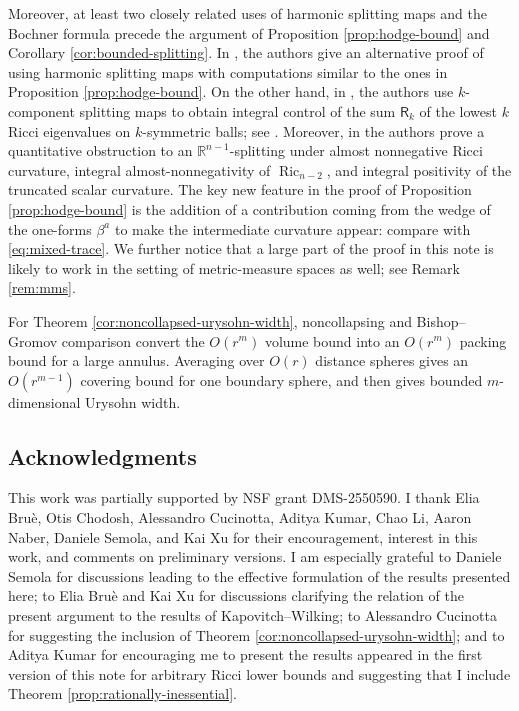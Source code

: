 \documentclass[11pt]{amsart}
\theoremstyle{definition}
\theoremstyle{remark}
\begin{document}
Moreover, at least two closely related uses of harmonic splitting maps and the Bochner formula precede the argument of Proposition \ref{prop:hodge-bound} and Corollary \ref{cor:bounded-splitting}.  In \cite[Remark~3.1]{WangXieZhuZhu}, the authors give an alternative proof of \cite[Theorem 1.1(1)\&(2)]{WangXieZhuZhu} using harmonic splitting maps with computations similar to the ones in Proposition \ref{prop:hodge-bound}.  On the other hand, in \cite{CucinottaMondino}, the authors use $k$-component splitting maps to obtain integral control of the sum $\mathsf R_k$ of the lowest $k$ Ricci eigenvalues on $k$-symmetric balls; see \cite[Lemma~3.2 and Theorem~3.4]{CucinottaMondino}. Moreover, in \cite[Theorem~3.8(2)]{CucinottaMondino} the authors prove a quantitative obstruction to an $\mathbb R^{n-1}$-splitting under almost nonnegative Ricci curvature, integral almost-nonnegativity of $\operatorname{Ric}_{n-2}$, and integral positivity of the truncated scalar curvature. The key new feature in the proof of Proposition \ref{prop:hodge-bound} is the addition of a contribution coming from the wedge of the one-forms $\beta^a$ to make the intermediate curvature appear: compare with \eqref{eq:mixed-trace}. We further notice that a large part of the proof in this note is likely to work in the setting of metric-measure spaces as well; see Remark \ref{rem:mms}.
\vspace{0.1cm}

For Theorem \ref{cor:noncollapsed-urysohn-width}, noncollapsing and
Bishop--Gromov comparison convert the $O(r^m)$ volume bound into an $O(r^m)$
packing bound for a large annulus.  Averaging over $O(r)$ distance
spheres gives an $O(r^{m-1})$ covering bound for one boundary sphere,
and \cite[Theorem~3.3]{Papasoglu} then gives
bounded $m$-dimensional Urysohn width.

\subsection*{Acknowledgments}

This work was partially supported by NSF grant DMS-2550590. I thank Elia Bruè, Otis Chodosh, Alessandro Cucinotta, Aditya Kumar, Chao Li, Aaron Naber, Daniele Semola,
and Kai Xu for their encouragement, interest in this work, and comments
on preliminary versions.  I am especially grateful to Daniele Semola
for discussions leading to the effective formulation of the results presented here;
to Elia Bruè and Kai Xu for discussions clarifying the
relation of the present argument to the results of Kapovitch--Wilking; to Alessandro
Cucinotta for suggesting the inclusion of
Theorem \ref{cor:noncollapsed-urysohn-width}; and to Aditya Kumar for encouraging me to present the results appeared in the first version of this note for arbitrary Ricci lower bounds and suggesting that I include Theorem \ref{prop:rationally-inessential}.
\end{document}

